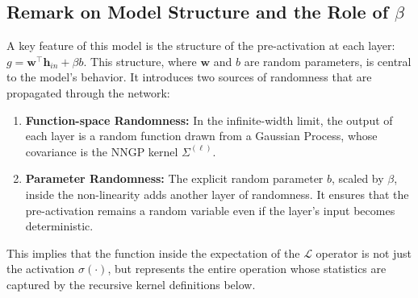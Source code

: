 \documentclass[12pt]{article}
\begin{document}
\subsection{Remark on Model Structure and the Role of \(\beta\)}
A key feature of this model is the structure of the pre-activation at each layer: $g = \bm{w}^\top \bm{h}_{in} + \beta b$. This structure, where $\bm{w}$ and $b$ are random parameters, is central to the model's behavior. It introduces two sources of randomness that are propagated through the network:
\begin{enumerate}
    \item \textbf{Function-space Randomness:} In the infinite-width limit, the output of each layer is a random function drawn from a Gaussian Process, whose covariance is the NNGP kernel $\Sigma^{(\ell)}$.
    \item \textbf{Parameter Randomness:} The explicit random parameter $b$, scaled by $\beta$, inside the non-linearity adds another layer of randomness. It ensures that the pre-activation remains a random variable even if the layer's input becomes deterministic. 
\end{enumerate}
This implies that the function inside the expectation of the $\mathcal{L}$ operator is not just the activation $\sigma(\cdot)$, but represents the entire operation whose statistics are captured by the recursive kernel definitions below.
\end{document}
